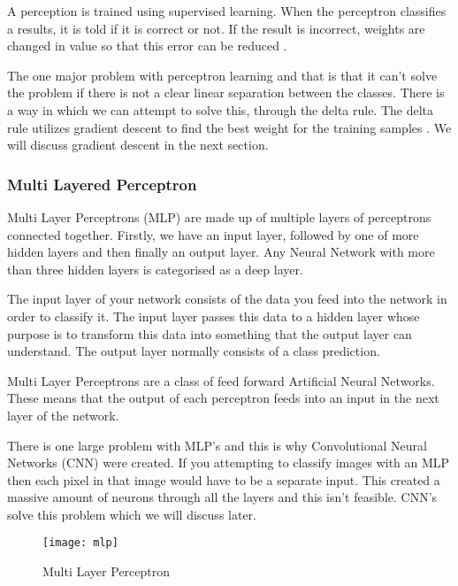 A perception is trained using supervised learning. When the perceptron
classifies a results, it is told if it is correct or not. If the result is
incorrect, weights are changed in value so that this error can be reduced
\textcite{AI}. 

The one major problem with perceptron learning and that is that it can't solve
the problem if there is not a clear linear separation between the classes. There
is a way in which we can attempt to solve this, through the delta rule. The
delta rule utilizes gradient descent to find the best weight for the training
samples \textcite{MLANN}. We will discuss gradient descent in the next section.

\subsubsection*{Multi Layered Perceptron}
Multi Layer Perceptrons (MLP) are made up of multiple layers of perceptrons connected
together.
Firstly, we have an input layer, followed by one of more hidden layers and then
finally an output layer.
Any Neural Network with more than three hidden layers is categorised as a deep
layer.

The input layer of your network consists of the data you feed into the network
in order to classify it. The input layer passes this data to a hidden layer
whose purpose is to transform this data into something that the output layer can
understand. The output layer normally consists of a class prediction.

Multi Layer Perceptrons are a class of feed forward Artificial Neural Networks.
These means that the output of each perceptron feeds into an input in the next
layer of the network.

There is one large problem with MLP's and this is why Convolutional Neural
Networks (CNN) were created. If you attempting to classify images with an MLP then
each pixel in that image would have to be a separate input. This created a
massive amount of neurons through all the layers and this isn't feasible. CNN's
solve this problem which we will discuss later.

\begin{figure}
    \texttt{[image: mlp]}
     \caption{Multi Layer Perceptron}
     \label{fig:mlp}
\end{figure}

